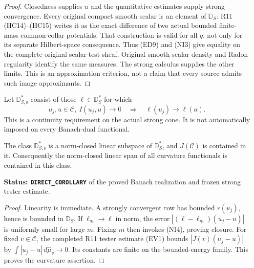 \begin{proof}
Closedness supplies $u$ and the quantitative estimates supply
strong convergence. Every original compact smooth scalar is an
element of $\mathbb D_S$: R11 (HC14)--(HC15) writes it as the
exact difference of two actual bounded finite-mass common-collar
potentials. That construction is valid for all $q$, not only
for its separate Hilbert-space consequence. Thus (ED9) and
(NI3) give equality on the complete original scalar test sheaf.
Original smooth scalar density and Radon regularity identify
the same measures. The strong calculus supplies the other
limits. This is an approximation criterion, not a claim that
every source admits such image approximants.
\end{proof}

\begin{definition}
\label{def:r12-strong-continuous-dual}
Let $\mathbb D_{S,\mathrm{s}}^*$ consist of those
$\ell\in\mathbb D_S^*$ for which
\[
  u_j,u\in\mathscr C,\ I(u_j,u)\to0
                 \quad\Longrightarrow\quad\ell(u_j)\to\ell(u).
 \tag{NI4}
\]
This is a continuity requirement on the actual strong cone.
It is not automatically imposed on every Banach-dual functional.
\end{definition}

\begin{lemma}
\label{lem:r12-strong-dual-closed}
The class $\mathbb D_{S,\mathrm{s}}^*$ is a norm-closed linear
subspace of $\mathbb D_S^*$, and $J(\mathscr C)$ is contained
in it. Consequently the norm-closed linear span of all curvature
functionals is contained in this class.
\end{lemma}

\noindent\textbf{Status: \texttt{DIRECT\_COROLLARY}} of the
proved Banach realization and frozen strong tester estimate.

\begin{proof}
Linearity is immediate. A strongly convergent row has bounded
$r(u_j)$, hence is bounded in $\mathbb D_S$. If $\ell_m\to\ell$
in norm, the error $|(\ell-\ell_m)(u_j-u)|$ is uniformly small
for large $m$. Fixing $m$ then invokes (NI4), proving closure.
For fixed $v\in\mathscr C$, the completed R11 tester estimate
(EV1) bounds $|J(v)(u_j-u)|$ by
$\int|u_j-u|\,d\widehat\mu_v\to0$. Its constants are finite
on the bounded-energy family. This proves the curvature assertion.
\end{proof}

